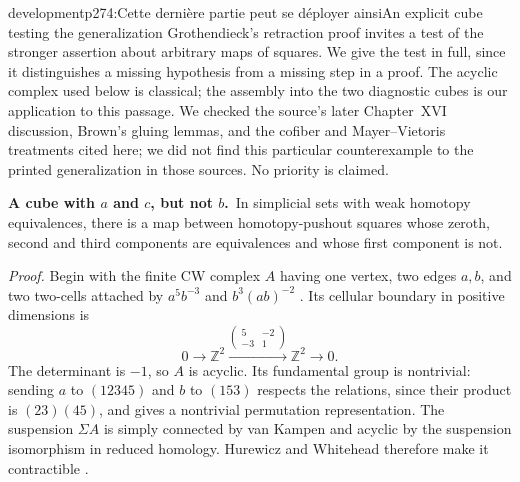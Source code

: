 \begin{dcomment}{development}{p274:Cette dernière partie peut se déployer ainsi}{An explicit cube testing the generalization}
Grothendieck's retraction proof invites a test of the stronger assertion about arbitrary maps of squares. We give the test in full, since it distinguishes a missing hypothesis from a missing step in a proof. The acyclic complex used below is classical; the assembly into the two diagnostic cubes is our application to this passage. We checked the source's later Chapter~XVI discussion, Brown's gluing lemmas, and the cofiber and Mayer--Vietoris treatments cited here; we did not find this particular counterexample to the printed generalization in those sources. No priority is claimed.

\textbf{A cube with $a$ and $c$, but not $b$.}\ours\ 
In simplicial sets with weak homotopy equivalences, there is a map between homotopy-pushout squares whose zeroth, second and third components are equivalences and whose first component is not.

\emph{Proof.} Begin with the finite CW complex $A$ having one vertex, two edges $a,b$, and two two-cells attached by $a^5b^{-3}$ and $b^3(ab)^{-2}$ \citep[Example~2.38]{Hatcher2002}. Its cellular boundary in positive dimensions is
\[
 0\longrightarrow\mathbb Z^2
 \xrightarrow{\left(\begin{smallmatrix}5&-2\\-3&1\end{smallmatrix}\right)}
 \mathbb Z^2\longrightarrow0.
\]
The determinant is $-1$, so $A$ is acyclic. Its fundamental group is nontrivial: sending $a$ to $(12345)$ and $b$ to $(153)$ respects the relations, since their product is $(23)(45)$, and gives a nontrivial permutation representation. The suspension $\Sigma A$ is simply connected by van Kampen and acyclic by the suspension isomorphism in reduced homology. Hurewicz and Whitehead therefore make it contractible \citep[Theorem~4.32 and Corollary~4.33]{Hatcher2002}.


\end{dcomment}
